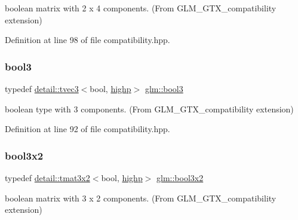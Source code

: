 boolean matrix with 2 x 4 components. (From G\+L\+M\+\_\+\+G\+T\+X\+\_\+compatibility extension) 



Definition at line 98 of file compatibility.\+hpp.

\mbox{\label{group__gtx__compatibility_gad18ebb149851844fd704e138c4af9a44}} 
\subsubsection{\texorpdfstring{bool3}{bool3}}
{\footnotesize\ttfamily typedef \hyperlink{structglm_1_1detail_1_1tvec3}{detail\+::tvec3}$<$bool, \hyperlink{namespaceglm_a0f04f086094c747d227af4425893f545ac6f7eab42eacbb10d59a58e95e362074}{highp}$>$ \hyperlink{group__gtx__compatibility_gad18ebb149851844fd704e138c4af9a44}{glm\+::bool3}}



boolean type with 3 components. (From G\+L\+M\+\_\+\+G\+T\+X\+\_\+compatibility extension) 



Definition at line 92 of file compatibility.\+hpp.

\mbox{\label{group__gtx__compatibility_gacf961fda4c64459911f552cbffdbffa8}} 
\subsubsection{\texorpdfstring{bool3x2}{bool3x2}}
{\footnotesize\ttfamily typedef \hyperlink{structglm_1_1detail_1_1tmat3x2}{detail\+::tmat3x2}$<$bool, \hyperlink{namespaceglm_a0f04f086094c747d227af4425893f545ac6f7eab42eacbb10d59a58e95e362074}{highp}$>$ \hyperlink{group__gtx__compatibility_gacf961fda4c64459911f552cbffdbffa8}{glm\+::bool3x2}}



boolean matrix with 3 x 2 components. (From G\+L\+M\+\_\+\+G\+T\+X\+\_\+compatibility extension) 



